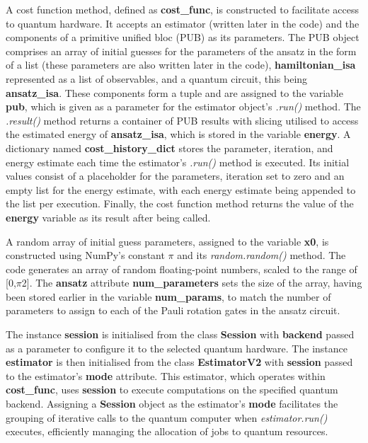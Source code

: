 \documentclass{article}
\begin{document}
A cost function method, defined as \textbf{cost\_func}, is constructed to facilitate access to quantum hardware. It accepts an estimator (written later in the code) and the components of a primitive unified bloc (PUB) as its parameters. The PUB object comprises an array of initial guesses for the parameters of the ansatz in the form of a list (these parameters are also written later in the code), \textbf{hamiltonian\_isa} represented as a list of observables, and a quantum circuit, this being \textbf{ansatz\_isa}. These components form a tuple and are assigned to the variable \textbf{pub}, which is given as a parameter for the estimator object's \textit{.run()} method. The \textit{.result()} method returns a container of PUB results\cite{PrimitiveResult} with slicing utilised to access the estimated energy of \textbf{ansatz\_isa}, which is stored in the variable \textbf{energy}. A dictionary named \textbf{cost\_history\_dict} stores the parameter, iteration, and energy estimate each time the estimator's \textit{.run()} method is executed. Its initial values consist of a placeholder for the parameters, iteration set to zero and an empty list for the energy estimate, with each energy estimate being appended to the list per execution. Finally, the cost function method returns the value of the \textbf{energy} variable as its result after being called.

A random array of initial guess parameters, assigned to the variable \textbf{x0}, is constructed using NumPy’s constant $\pi$ and its \textit{random.random()} method. The code generates an array of random floating-point numbers, scaled to the range of [0,$\pi$2]. The \textbf{ansatz} attribute \textbf{num\_parameters} sets the size of the array, having been stored earlier in the variable \textbf{num\_params}, to match the number of parameters to assign to each of the Pauli rotation gates in the ansatz circuit.

The instance \textbf{session} is initialised from the class \textbf{Session} with \textbf{backend} passed as a parameter to configure it to the selected quantum hardware. The instance \textbf{estimator} is then initialised from the class \textbf{EstimatorV2} with \textbf{session} passed to the estimator's \textbf{mode} attribute. This estimator, which operates within \textbf{cost\_func}, uses \textbf{session} to execute computations on the specified quantum backend. Assigning a  \textbf{Session} object as the estimator's \textbf{mode} facilitates the grouping of iterative calls to the quantum computer\cite{Session} when \textit{estimator.run()} executes, efficiently managing the allocation of jobs to quantum resources.
\end{document}
